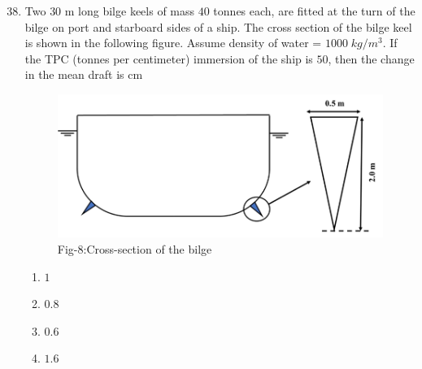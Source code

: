 \documentclass[journal]{IEEEtran}
\theoremstyle{remark}
\begin{document}
\begin{enumerate}[itemsep=1em]
\setcounter{enumi}{37}
\item Two $30$ m long bilge keels of mass $40$ tonnes each, are fitted at the turn of the bilge on port and starboard sides of a ship. The cross section of the bilge keel is shown in the following figure. Assume density of water = $1000\;kg/m^3$. If the TPC (tonnes per centimeter) immersion of the ship is $50$, then the change in the mean draft is \underline{\hspace{1cm}} cm 
\begin{figure}[H]
    \centering
    \includegraphics[width=0.6\columnwidth]{figs/fig-8.jpeg}
    \caption*{Fig-8:Cross-section of the bilge}
    \label{fig-8}
\end{figure}
\begin{multicols}{4}
\begin{enumerate}
    \item $1$
    \item $0.8$
    \item $0.6$
    \item $1.6$
\end{enumerate}
\end{multicols}
\end{enumerate}
\end{document}
